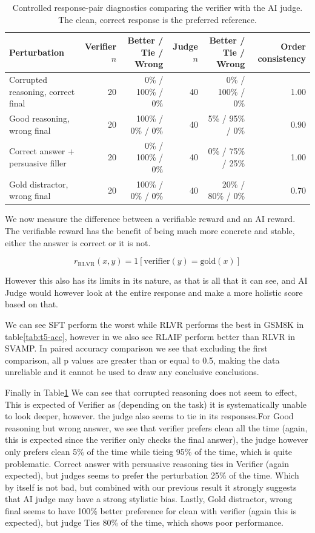 \documentclass{article}
\begin{document}
\begin{table}[H]
\centering
\small
\caption{Controlled response-pair diagnostics comparing the verifier with the AI judge. The clean, correct response is the preferred reference.}
\label{tab:t5-diag}
\begin{tabular}{lrrrrr}
\toprule
Perturbation & Verifier $n$ & Better / Tie / Wrong &
Judge $n$ & Better / Tie / Wrong & Order consistency \\
\midrule
Corrupted reasoning, correct final
& 20 & 0\% / 100\% / 0\%
& 40 & 0\% / 100\% / 0\% & 1.00 \\

Good reasoning, wrong final
& 20 & 100\% / 0\% / 0\%
& 40 & 5\% / 95\% / 0\% & 0.90 \\

Correct answer + persuasive filler
& 20 & 0\% / 100\% / 0\%
& 40 & 0\% / 75\% / 25\% & 1.00 \\

Gold distractor, wrong final
& 20 & 100\% / 0\% / 0\%
& 40 & 20\% / 80\% / 0\% & 0.70 \\
\bottomrule
\end{tabular}
\end{table}

We now measure the difference between a verifiable reward and an AI reward. The verifiable reward has the benefit of being much more concrete and stable, either the answer is correct or
it is not.

\[r_{\mathrm{RLVR}}(x, y) = 1\left[\mathrm{verifier}(y) = \mathrm{gold}(x)\right]\]

However this also has its limits in its nature, as that is all that it can see, and AI Judge would however look at the entire response and make a more holistic score based on that.

We can see SFT perform the worst while RLVR performs the best in GSM8K in table\ref{tab:t5-acc}, however in we also see RLAIF perform better than RLVR in SVAMP.
In paired accuracy comparison we see that excluding the first comparison, all p values are greater than or equal to 0.5, making the data unreliable and it cannot be used to draw any
conclusive conclusions.

Finally in Table\ref{tab:t5-diag} We can see that corrupted reasoning does not seem to effect, This is expected of Verifier as (depending on the task) it is systematically unable to look deeper, however.
the judge also seems to tie in its responses.For Good reasoning but wrong answer, we see that verifier prefers clean all the time (again, this is expected since the verifier only checks the final answer),
the judge however only prefers clean 5\% of the time while tieing 95\% of the time, which is quite problematic. Correct answer with persuasive reasoning ties in Verifier (again expected), but judges seems to prefer
the perturbation 25\% of the time. Which by itself is not bad, but combined with our previous result it strongly suggests that AI judge may have a strong stylistic bias. Lastly,
Gold distractor, wrong final seems to have 100\% better preference for clean with verifier (again this is expected), but judge Ties 80\% of the time, which shows poor performance.
\end{document}
